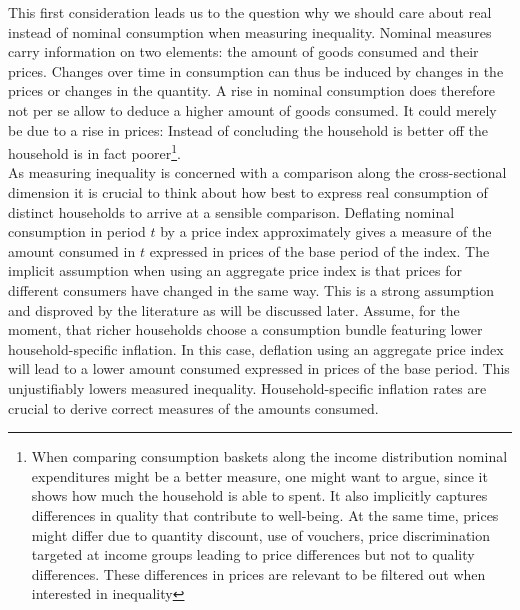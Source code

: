 \documentclass{article}
\begin{document}
This first consideration leads us to the question why we should care about real instead of nominal consumption when measuring inequality. Nominal measures carry information on two elements: the amount of goods consumed and their prices. Changes over time in consumption can thus be induced by changes in the prices or changes in the quantity. A rise in nominal consumption does therefore not per se allow to deduce a higher amount of goods consumed. It could merely be due to a rise in prices: Instead of concluding the household is better off the household is in fact poorer\footnote{When comparing consumption baskets along the income distribution nominal expenditures might be a better measure, one might want to argue, since it shows how much the household is able to spent. It also implicitly captures differences in quality that contribute to well-being. At the same time, prices might differ due to quantity discount, use of vouchers, price discrimination targeted at income groups leading to price differences but not to quality differences. These differences in prices are relevant to be filtered out when interested in inequality}.\\
As measuring inequality is concerned with a comparison along the cross-sectional dimension it is crucial to think about how best to express real consumption of distinct households to arrive at a sensible comparison. Deflating nominal consumption in period $t$ by a price index approximately gives a measure of the amount consumed in $t$ expressed in prices of the base period of the index. The implicit assumption when using an aggregate price index is that prices for different consumers have changed in the same way. This is a strong assumption and disproved by the literature as will be discussed later. 
 Assume, for the moment, that richer households choose a consumption bundle featuring lower household-specific inflation. In this case, deflation using an aggregate price index will lead to a lower amount consumed expressed in prices of the base period. This unjustifiably lowers measured inequality. 
Household-specific inflation rates are crucial to derive correct measures of the amounts consumed. \\
\end{document}
